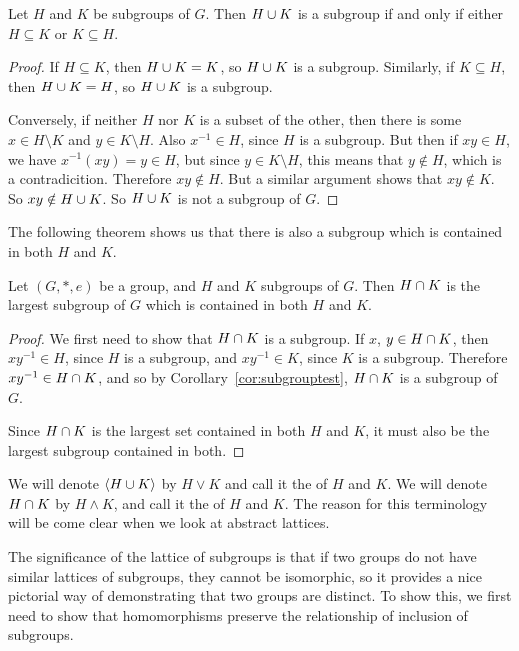 \begin{proposition}
  Let $H$ and $K$ be subgroups of $G$.  Then $H \cup K$ is a subgroup if and only
  if either $H \subseteq K$ or $K \subseteq H$.
\end{proposition}
\begin{proof}
  If $H \subseteq K$, then $H \cup K = K$, so $H \cup K$ is a subgroup.
  Similarly, if $K \subseteq H$, then $H \cup K = H$, so $H \cup K$ is
  a subgroup.
  
  Conversely, if neither $H$ nor $K$ is a subset of the other, then there is
  some $x \in H \setminus K$ and $y \in K \setminus H$.  Also $x^{-1} \in H$,
  since $H$ is a subgroup. But then if $xy \in H$, we have $x^{-1}(xy) = y
  \in H$, but since $y \in K \setminus H$, this means that $y \notin H$, which
  is a contradicition.  Therefore $xy \notin H$.  But a similar argument
  shows that $xy \notin K$.  So $xy \notin H \cup K$.  So $H \cup K$
  is not a subgroup of $G$.
\end{proof}

The following theorem shows us that there is also a subgroup which is contained
in both $H$ and $K$.

\begin{theorem}
  Let $(G, \ast, e)$ be a group, and $H$ and $K$ subgroups of $G$.  Then
  $H \cap K$ is the largest subgroup of $G$ which is contained in both
  $H$ and $K$.
\end{theorem}
\begin{proof}
  We first need to show that $H \cap K$ is a subgroup.  If $x$,
  $y \in H \cap K$, then $xy^{-1} \in H$, since $H$ is a subgroup,
  and $xy^{-1} \in K$, since $K$ is a subgroup.  Therefore $xy^{-1} \in
  H \cap K$, and so by Corollary~\ref{cor:subgrouptest},
  $H \cap K$ is a subgroup of $G$.
  
  Since $H \cap K$ is the largest set contained in both $H$ and $K$,
  it must also be the largest subgroup contained in both.
\end{proof}

We will denote $\langle H \cup K \rangle$ by $H \vee K$ and call it the
 of $H$ and $K$.  We will denote $H \cap K$
by $H \wedge K$, and call it the  of $H$ and $K$.
The reason for this terminology will be come clear when we look at abstract
lattices.

The significance of the lattice of subgroups is that if two groups do not have
similar lattices of subgroups, they cannot be isomorphic, so it provides a
nice pictorial way of demonstrating that two groups are distinct.  To show
this, we first need to show that homomorphisms preserve the relationship of
inclusion of subgroups.

